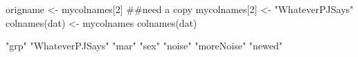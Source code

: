\begin{Schunk}
\begin{Sinput}
  origname <- mycolnames[2] ##need a copy
  mycolnames[2] <- "WhateverPJSays"
  colnames(dat) <- mycolnames
  colnames(dat)
\end{Sinput}
\begin{Soutput}
[1] "grp"            "WhateverPJSays" "mar"            "sex"            "noise"          "moreNoise"      "newed"         
\end{Soutput}
\end{Schunk}
